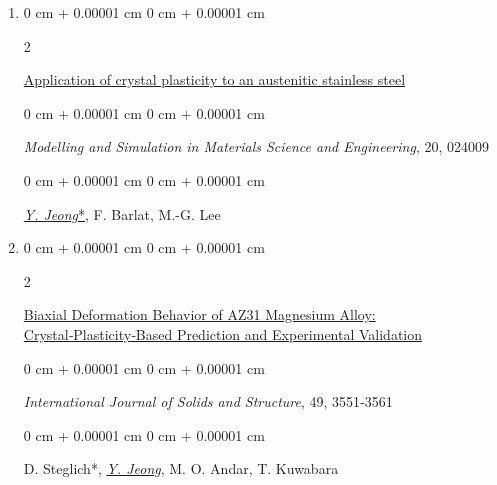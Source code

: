 \documentclass[10pt, letterpaper]{article}
\newenvironment{onecolentry}{
    \begin{adjustwidth}{
        0 cm + 0.00001 cm
    }{
        0 cm + 0.00001 cm
    }
}{
    \end{adjustwidth}
} %
\newenvironment{twocolentry}[2][]{
    \onecolentry
    \def\secondColumn{#2}
    \setcolumnwidth{\fill, 4.5 cm}
    \begin{paracol}{2}
}{
    \switchcolumn \raggedleft \secondColumn
    \end{paracol}
    \endonecolentry
} %
\begin{document}
\begin{enumerate}
        \item
        \begin{twocolentry}{2012}
            \href{http://dx.doi.org/10.1088/0965-0393/20/2/024009}{Application of crystal plasticity to an austenitic stainless steel }
        \end{twocolentry}
        \begin{onecolentry}
            {\it Modelling and Simulation in Materials Science and Engineering}, 20, 024009
        \end{onecolentry}
        \begin{onecolentry}
            {\underline{\textit{Y. Jeong}*}}, F. Barlat, M.-G. Lee
        \end{onecolentry}
        \vspace{0.10 cm}


        \item
        \begin{twocolentry}{2012}
            \href{http://dx.doi.org/10.1016/j.ijsolstr.2012.06.017}{Biaxial Deformation Behavior of AZ31 Magnesium Alloy: Crystal‑Plasticity‑Based Prediction and Experimental Validation}
        \end{twocolentry}
        \begin{onecolentry}
            {\it International Journal of Solids and Structure}, 49, 3551‑3561
        \end{onecolentry}
        \begin{onecolentry}
            D. Steglich*, {\underline{\textit{Y. Jeong}}}, M. O. Andar, T. Kuwabara
        \end{onecolentry}
        \vspace{0.10 cm}

    \end{enumerate}
\end{document}

